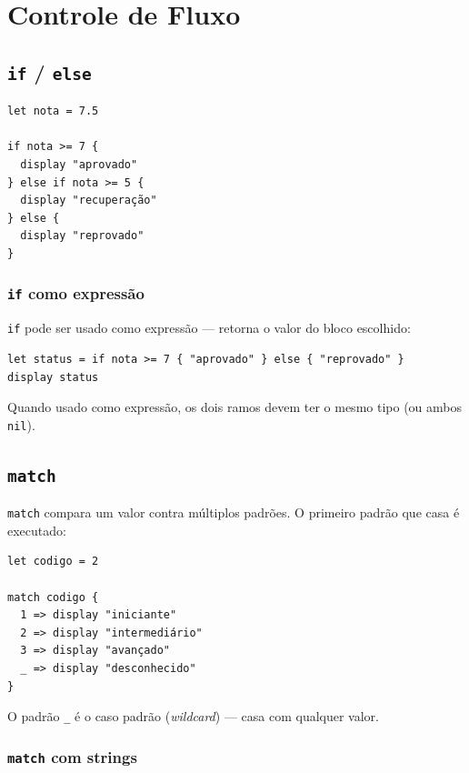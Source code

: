 \chapter{Controle de Fluxo}

\section{\texttt{if} / \texttt{else}}

\begin{lstlisting}[caption={Estrutura básica de if/else}]
let nota = 7.5

if nota >= 7 {
  display "aprovado"
} else if nota >= 5 {
  display "recuperação"
} else {
  display "reprovado"
}
\end{lstlisting}

\subsection*{\texttt{if} como expressão}

\lstinline{if} pode ser usado como expressão — retorna o valor do bloco escolhido:

\begin{lstlisting}
let status = if nota >= 7 { "aprovado" } else { "reprovado" }
display status
\end{lstlisting}

Quando usado como expressão, os dois ramos devem ter o mesmo tipo (ou ambos \texttt{nil}).

\section{\texttt{match}}

\lstinline{match} compara um valor contra múltiplos padrões. O primeiro padrão que
casa é executado:

\begin{lstlisting}[caption={match com literais}]
let codigo = 2

match codigo {
  1 => display "iniciante"
  2 => display "intermediário"
  3 => display "avançado"
  _ => display "desconhecido"
}
\end{lstlisting}

O padrão \lstinline{_} é o caso padrão (\textit{wildcard}) — casa com qualquer valor.

\subsection*{\texttt{match} com strings}


